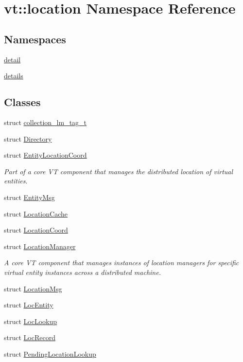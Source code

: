 \hypertarget{namespacevt_1_1location}{}\section{vt\+:\+:location Namespace Reference}
\label{namespacevt_1_1location}
\subsection*{Namespaces}
\begin{DoxyCompactItemize}
\item 
 \hyperlink{namespacevt_1_1location_1_1detail}{detail}
\item 
 \hyperlink{namespacevt_1_1location_1_1details}{details}
\end{DoxyCompactItemize}
\subsection*{Classes}
\begin{DoxyCompactItemize}
\item 
struct \hyperlink{structvt_1_1location_1_1collection__lm__tag__t}{collection\+\_\+lm\+\_\+tag\+\_\+t}
\item 
struct \hyperlink{structvt_1_1location_1_1_directory}{Directory}
\item 
struct \hyperlink{structvt_1_1location_1_1_entity_location_coord}{Entity\+Location\+Coord}
\begin{DoxyCompactList}\small\item\em Part of a core VT component that manages the distributed location of virtual entities. \end{DoxyCompactList}\item 
struct \hyperlink{structvt_1_1location_1_1_entity_msg}{Entity\+Msg}
\item 
struct \hyperlink{structvt_1_1location_1_1_location_cache}{Location\+Cache}
\item 
struct \hyperlink{structvt_1_1location_1_1_location_coord}{Location\+Coord}
\item 
struct \hyperlink{structvt_1_1location_1_1_location_manager}{Location\+Manager}
\begin{DoxyCompactList}\small\item\em A core VT component that manages instances of location managers for specific virtual entity instances across a distributed machine. \end{DoxyCompactList}\item 
struct \hyperlink{structvt_1_1location_1_1_location_msg}{Location\+Msg}
\item 
struct \hyperlink{structvt_1_1location_1_1_loc_entity}{Loc\+Entity}
\item 
struct \hyperlink{structvt_1_1location_1_1_loc_lookup}{Loc\+Lookup}
\item 
struct \hyperlink{structvt_1_1location_1_1_loc_record}{Loc\+Record}
\item 
struct \hyperlink{structvt_1_1location_1_1_pending_location_lookup}{Pending\+Location\+Lookup}
\end{DoxyCompactItemize}
